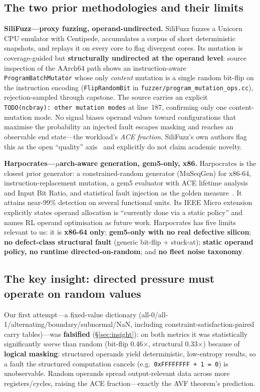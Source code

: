 \documentclass[sigplan,review,anonymous]{acmart}
\begin{document}
\subsection{The two prior methodologies and their limits}
\textbf{SiliFuzz---proxy fuzzing, operand-undirected.} SiliFuzz fuzzes a Unicorn CPU emulator with Centipede, accumulates a corpus of short deterministic snapshots, and replays it on every core to flag divergent cores. Its mutation is coverage-guided but \textbf{structurally undirected at the operand level}: source inspection of the AArch64 path shows an instruction-aware \texttt{ProgramBatchMutator} whose only \emph{content} mutation is a single random bit-flip on the instruction encoding (\texttt{FlipRandomBit} in \texttt{fuzzer/program\_mutation\_ops.cc}), rejection-sampled through capstone. The source carries an explicit \texttt{TODO(ncbray): other mutation modes} at line~187, confirming only one content-mutation mode. No signal biases operand values toward configurations that maximise the probability an injected fault escapes masking and reaches an observable end state---the workload's \emph{ACE fraction}. SiliFuzz's own authors flag this as the open ``quality'' axis~\cite{silifuzz} and explicitly do not claim academic novelty.

\textbf{Harpocrates---\(\mu\)arch-aware generation, gem5-only, x86.} Harpocrates is the closest prior generator: a constrained-random generator (MuSeqGen) for x86-64, instruction-replacement mutation, a gem5 evaluator with ACE lifetime analysis and Input Bit Ratio, and statistical fault injection as the golden measure~\cite{harpocrates_isca24,harpocrates_micro26}. It attains near-99\% detection on several functional units. Its IEEE Micro extension explicitly states operand allocation is ``currently done via a static policy'' and names RL operand optimisation as future work. Harpocrates has five limits relevant to us: it is \textbf{x86-64 only}; \textbf{gem5-only with no real defective silicon}; \textbf{no defect-class structural fault} (generic bit-flip + stuck-at); \textbf{static operand policy, no runtime directed-on-random}; and \textbf{no fleet noise taxonomy}.

\subsection{The key insight: directed pressure must operate on random values}
Our first attempt---a fixed-value dictionary (all-0/all-1/alternating/boundary/subnormal/NaN, including constraint-satisfaction-paired carry tables)---was \textbf{falsified} (\S\ref{sec:insight}): on both metrics it was statistically significantly \emph{worse} than random (bit-flip 0.46$\times$, structural 0.33$\times$) because of \textbf{logical masking}: structured operands yield deterministic, low-entropy results, so a fault the structured computation cancels (e.g.\ \texttt{0xFFFFFFFF + 1 = 0}) is unobservable. Random operands spread output-relevant data across more registers/cycles, raising the ACE fraction---exactly the AVF theorem's prediction.
\end{document}
